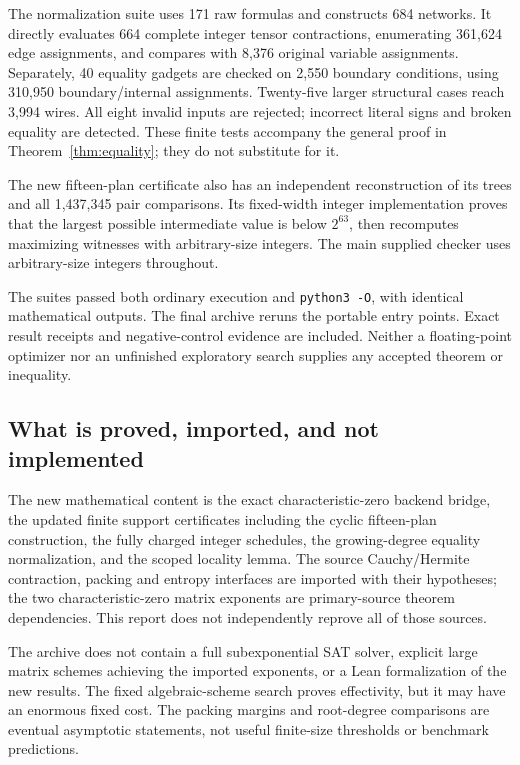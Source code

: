The normalization suite uses 171 raw formulas and constructs 684
networks. It directly evaluates 664 complete integer tensor contractions,
enumerating 361,624 edge assignments, and compares with 8,376 original
variable assignments. Separately, 40 equality gadgets are checked on
2,550 boundary conditions, using 310,950 boundary/internal assignments.
Twenty-five larger structural cases reach 3,994 wires. All eight invalid
inputs are rejected; incorrect literal signs and broken equality are
detected. These finite tests accompany the general proof in
Theorem~\ref{thm:equality}; they do not substitute for it.

The new fifteen-plan certificate also has an independent reconstruction
of its trees and all 1,437,345 pair comparisons. Its fixed-width integer
implementation proves that the largest possible intermediate value is
below $2^{63}$, then recomputes maximizing witnesses with arbitrary-size
integers. The main supplied checker uses arbitrary-size integers throughout.

The suites passed both ordinary execution and \texttt{python3 -O}, with
identical mathematical outputs. The final archive reruns the portable
entry points. Exact result receipts and negative-control evidence are
included. Neither a floating-point optimizer nor an unfinished exploratory
search supplies any accepted theorem or inequality.

\subsection{What is proved, imported, and not implemented}

The new mathematical content is the exact characteristic-zero backend
bridge, the updated finite support certificates including the cyclic
fifteen-plan construction, the fully charged integer schedules, the
growing-degree equality normalization, and the scoped locality lemma.
The source Cauchy/Hermite contraction, packing and entropy interfaces are
imported with their hypotheses; the two characteristic-zero matrix
exponents are primary-source theorem dependencies. This report does not
independently reprove all of those sources.

The archive does not contain a full subexponential SAT solver, explicit
large matrix schemes achieving the imported exponents, or a Lean
formalization of the new results. The fixed algebraic-scheme search proves
effectivity, but it may have an enormous fixed cost. The packing margins
and root-degree comparisons are eventual asymptotic statements, not
useful finite-size thresholds or benchmark predictions.

